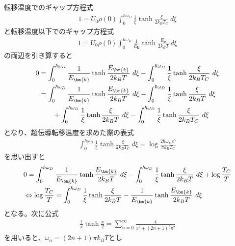 \documentclass[dvipdfmx, 11pt, a4paper]{jsarticle}
\numberwithin{equation}{section}
\theoremstyle{definition}
\begin{document}
    \begin{derivationBox}
        転移温度でのギャップ方程式
        \begin{align}
            1 = U_0\rho(0)\int_{0}^{\hbar \omega_D}   \frac{1}{\xi} \tanh \frac{ \xi}{2k_B T_C}\ d\xi
        \end{align}
        と転移温度以下でのギャップ方程式
        \begin{align}
            1  =  U_0\rho(0) \int_0^{\hbar \omega_D}  \frac{1}{E_{\bm{k}}} \tanh \frac{ E_{\bm{k}}}{2k_B T}\ d\xi
        \end{align}
        の両辺を引き算すると
        \begin{align}
            0 &= \int_0^{\hbar \omega_D}  \frac{1}{E_{\bm{k}}} \tanh \frac{ E_{\bm{k}}}{2k_B T}\  d\xi - \int_{0}^{\hbar \omega_D}   \frac{1}{\xi} \tanh \frac{ \xi}{2k_B T_C}\ d\xi  \notag \\
            &= \int_0^{\hbar \omega_D}  \frac{1}{E_{\bm{k}}} \tanh \frac{ E_{\bm{k}}}{2k_B T}\  d\xi - \int_{0}^{\hbar \omega_D}   \frac{1}{\xi} \tanh \frac{ \xi}{2k_B T}\ d\xi \notag \\
            &\ \ \ \ \ \  + \int_0^{\hbar \omega_D}  \frac{1}{\xi} \tanh \frac{ \xi}{2k_B T}\  d\xi - \int_{0}^{\hbar \omega_D}   \frac{1}{\xi} \tanh \frac{ \xi}{2k_B T_C}\ d\xi 
        \end{align}
        となり、超伝導転移温度を求めた際の表式
        \begin{align}
              \int_{0}^{\hbar \omega_D}\frac{1}{\xi} \tanh \frac{ \xi}{2k_B T_C}\ d\xi  = \log \frac{2\hbar \omega_D e^\gamma}{\pi k_B T_C}
        \end{align}
        を思い出すと
        \begin{align}
            &0 = \int_0^{\hbar \omega_D}  \frac{1}{E_{\bm{k}}} \tanh \frac{ E_{\bm{k}}}{2k_B T}\  d\xi - \int_{0}^{\hbar \omega_D}   \frac{1}{\xi} \tanh \frac{ \xi}{2k_B T}\ d\xi + \log \frac{T_C}{T}\notag \\
            &\Leftrightarrow \log \frac{T_C}{T} = \int_{0}^{\hbar \omega_D}   \frac{1}{\xi} \tanh \frac{ \xi}{2k_B T} -   \frac{1}{E_{\bm{k}}} \tanh \frac{ E_{\bm{k}}}{2k_B T}\  d\xi \label{GyapTeniFkinTach}
        \end{align}
        となる。次に公式
        \begin{align}
            \frac{1}{x}\tanh \frac{x}{2} = \sum_{n=0}^\infty \frac{4}{x^2 + (2n+1)^2 \pi^2}
        \end{align}
        を用いると、$\omega_n = (2n+1)\pi k_BT$とし
        \begin{align}

\end{align}
\end{derivationBox}
\end{document}
